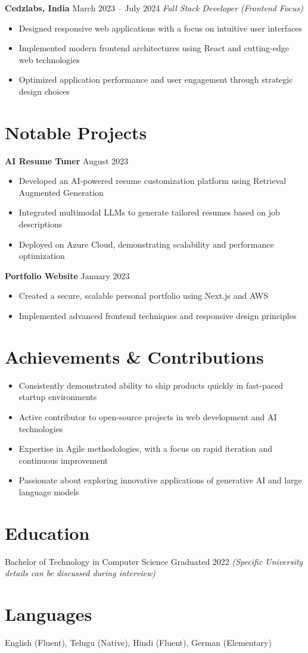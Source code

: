 \documentclass[letterpaper,11pt]{article}
\begin{document}
\textbf{Cedzlabs, India} \hfill March 2023 -- July 2024
\textit{Full Stack Developer (Frontend Focus)}
\begin{itemize}
\item Designed responsive web applications with a focus on intuitive user interfaces
\item Implemented modern frontend architectures using React and cutting-edge web technologies
\item Optimized application performance and user engagement through strategic design choices
\end{itemize}

\section*{Notable Projects}

\textbf{AI Resume Tuner} \hfill August 2023
\begin{itemize}
\item Developed an AI-powered resume customization platform using Retrieval Augmented Generation
\item Integrated multimodal LLMs to generate tailored resumes based on job descriptions
\item Deployed on Azure Cloud, demonstrating scalability and performance optimization
\end{itemize}

\textbf{Portfolio Website} \hfill January 2023
\begin{itemize}
\item Created a secure, scalable personal portfolio using Next.js and AWS
\item Implemented advanced frontend techniques and responsive design principles
\end{itemize}
\vspace{-10pt}
\section*{Achievements \& Contributions}
\begin{itemize}
\item Consistently demonstrated ability to ship products quickly in fast-paced startup environments
\item Active contributor to open-source projects in web development and AI technologies
\item Expertise in Agile methodologies, with a focus on rapid iteration and continuous improvement
\item Passionate about exploring innovative applications of generative AI and large language models
\end{itemize}
\vspace{-8pt}
\section*{Education}
Bachelor of Technology in Computer Science \hfill Graduated 2022
\textit{(Specific University details can be discussed during interview)}
\vspace{-10pt}
\section*{Languages}
English (Fluent), Telugu (Native), Hindi (Fluent), German (Elementary)
\end{document}
